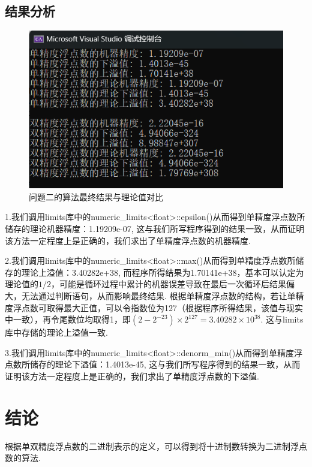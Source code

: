 \documentclass[UTF8,ctexart,a4paper,11pt,openany]{article}
\theoremstyle{definition}
\begin{document}
    \subsection{结果分析}
    \begin{figure}[htbp]
        \centering
        \includegraphics{pics/P2.1.png}
        \caption{问题二的算法最终结果与理论值对比}
        \label{graph:1}
        \end{figure}
    1.我们调用limits库中的numeric\_limits<float>::epsilon()从而得到单精度浮点数所储存的理论机器精度：1.19209e-07, 这与我们所写程序得到的结果一致，从而证明该方法一定程度上是正确的，我们求出了单精度浮点数的机器精度.\par 
    \vspace{10pt}
    2.我们调用limits库中的numeric\_limits<float>::max()从而得到单精度浮点数所储存的理论上溢值：3.40282e+38, 而程序所得结果为1.70141e+38，基本可以认定为理论值的$1/2$，可能是循环过程中累计的机器误差导致在最后一次循环后结果偏大，无法通过判断语句，从而影响最终结果. 根据单精度浮点数的结构，若让单精度浮点数可取得最大正值，可以令指数位为127（根据程序所得结果，该值与现实中一致），再令尾数位均取得1，即$(2-2^{-23})\times2^{127}=3.40282\times10^{38}$. 这与limits库中存储的理论上溢值一致. \par 
    \vspace{10pt}
    3.我们调用limits库中的numeric\_limits<float>::denorm\_min()从而得到单精度浮点数所储存的理论下溢值：1.4013e-45, 这与我们所写程序得到的结果一致，从而证明该方法一定程度上是正确的，我们求出了单精度浮点数的下溢值. \par
\section{结论}
根据单双精度浮点数的二进制表示的定义，可以得到将十进制数转换为二进制浮点数的算法. \par
\end{document}

